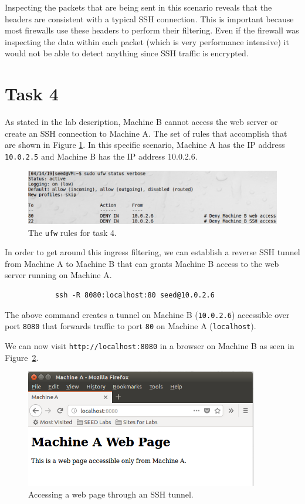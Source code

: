\documentclass[12pt,letterpaper]{article}
\begin{document}
			Inspecting the packets that are being sent in this scenario reveals that the headers are consistent with a typical SSH connection. This is important because most firewalls use these headers to perform their filtering. Even if the firewall was inspecting the data within each packet (which is very performance intensive) it would not be able to detect anything since SSH traffic is encrypted.
			
	\section*{Task 4}
		As stated in the lab description, Machine B cannot access the web server or create an SSH connection to Machine A. The set of rules that accomplish that are shown in Figure \ref{fig:task-4-ufw-rules}. In this specific scenario, Machine A has the IP address \texttt{10.0.2.5} and Machine B has the IP address {10.0.2.6}.
		
		\begin{figure}[h]
			\begin{center}
				\includegraphics[width=\linewidth]{task-4-ufw-rules}
			\end{center}
			\caption{The \texttt{ufw} rules for task 4.}
			\label{fig:task-4-ufw-rules}
		\end{figure}
	
		In order to get around this ingress filtering, we can establish a reverse SSH tunnel from Machine A to Machine B that can grants Machine B access to the web server running on Machine A.
		
		\begin{verbatim}
			ssh -R 8080:localhost:80 seed@10.0.2.6
		\end{verbatim}
		
		The above command creates a tunnel on Machine B (\texttt{10.0.2.6}) accessible over port \texttt{8080} that forwards traffic to port \texttt{80} on Machine A (\texttt{localhost}).
		
		We can now visit \texttt{http://localhost:8080} in a browser on Machine B as seen in Figure~\ref{fig:task-4-web-access}.
		
		\begin{figure}[h]
			\begin{center}
				\includegraphics[width=4in]{task-4-web-access}
			\end{center}
			\caption{Accessing a web page through an SSH tunnel.}
			\label{fig:task-4-web-access}
		\end{figure}
\end{document}
